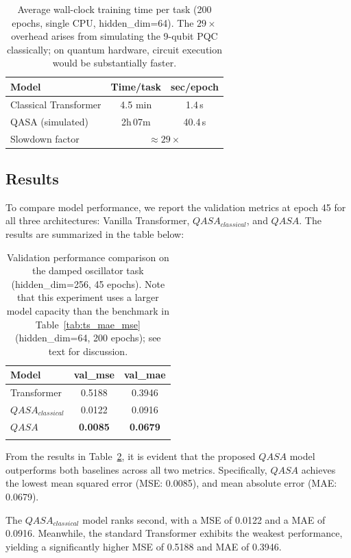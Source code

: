 \documentclass[conference]{IEEEtran}
\begin{document}
\begin{table}[h]
\centering
\caption{Average wall-clock training time per task (200 epochs, single CPU, hidden\_dim=64). The $29\times$ overhead arises from simulating the 9-qubit PQC classically; on quantum hardware, circuit execution would be substantially faster.}
\label{tab:training_time}
\begin{tabular}{l c c}
\hline
\textbf{Model} & \textbf{Time/task} & \textbf{sec/epoch} \\
\hline
Classical Transformer & 4.5 min & 1.4\,s \\
QASA (simulated) & 2h\,07m & 40.4\,s \\
\hline
Slowdown factor & \multicolumn{2}{c}{$\approx 29\times$} \\
\hline
\end{tabular}
\end{table}


\subsection{Results}
To compare model performance, we report the validation metrics at epoch 45 for all three architectures: Vanilla Transformer, $QASA_{classical}$, and $QASA$. The results are summarized in the table below:

\begin{table}[h]
\centering
\caption{Validation performance comparison on the damped oscillator task (hidden\_dim=256, 45 epochs). Note that this experiment uses a larger model capacity than the benchmark in Table~\ref{tab:ts_mae_mse} (hidden\_dim=64, 200 epochs); see text for discussion.}
\begin{tabular}{l c c}
\hline
\textbf{Model} & \textbf{val\_mse} & \textbf{val\_mae} \\
\hline
Transformer &  0.5188 & 0.3946 \\
$QASA_{classical}$ &  0.0122 & 0.0916 \\
$QASA$ &  \textbf{0.0085} & \textbf{0.0679} \\
\hline
\label{tab:mae_mse}
\end{tabular}
\end{table}


From the results in Table~\ref{tab:mae_mse}, it is evident that the proposed $QASA$ model outperforms both baselines across all two metrics. Specifically, $QASA$ achieves the lowest mean squared error (MSE: 0.0085), and mean absolute error (MAE: 0.0679).

The $QASA_{classical}$ model ranks second, with a MSE of 0.0122 and a MAE of 0.0916. Meanwhile, the standard Transformer exhibits the weakest performance, yielding a significantly higher MSE of 0.5188 and MAE of 0.3946.
\end{document}

